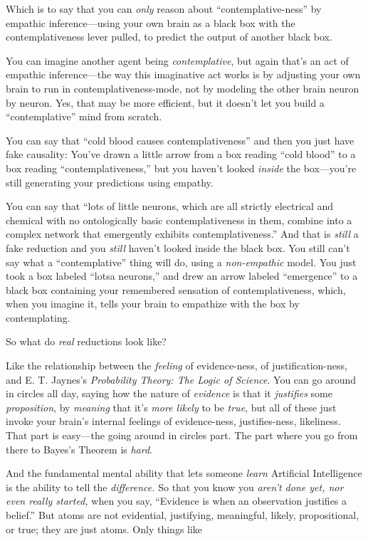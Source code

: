  Which is to say that you can \textit{only} reason about
``contemplative-ness'' by empathic
inference{}---using your own brain as a black box with the
contemplativeness lever pulled, to predict the output of another black
box.


 You can imagine another agent being \textit{contemplative}, but
again that's an act of empathic inference---the way
this imaginative act works is by adjusting your own brain to run in
contemplativeness-mode, not by modeling the other brain neuron by
neuron. Yes, that may be more efficient, but it doesn't
let you build a ``contemplative''
mind from scratch.


 You can say that ``cold blood causes
contemplativeness'' and then you just have fake
causality: You've drawn a little arrow from a box
reading ``cold blood'' to a box
reading ``contemplativeness,'' but
you haven't looked \textit{inside} the
box---you're still generating your predictions using
empathy.


 You can say that ``lots of little neurons, which
are all strictly electrical and chemical with no ontologically basic
contemplativeness in them, combine into a complex network that
emergently exhibits contemplativeness.'' And that is
\textit{still} a fake reduction and you \textit{still}
haven't looked inside the black box. You still
can't say what a
``contemplative'' thing will do,
using a \textit{non-empathic} model. You just took a box labeled
``lotsa neurons,'' and drew an arrow
labeled ``emergence'' to a black box
containing your remembered sensation of contemplativeness, which, when
you imagine it, tells your brain to empathize with the box by
contemplating.


 So what do \textit{real} reductions look like?


 Like the relationship between the \textit{feeling} of
evidence-ness, of justification-ness, and E. T.
Jaynes's \textit{Probability Theory: The Logic of
Science}. You can go around in circles all day, saying how the nature
of \textit{evidence} is that it \textit{justifies} some
\textit{proposition}, by \textit{meaning} that it's
\textit{more likely} to be \textit{true}, but all of these just invoke
your brain's internal feelings of evidence-ness,
justifies-ness, likeliness. That part is easy---the going around in
circles part. The part where you go from there to
Bayes's Theorem is \textit{hard}.


 And the fundamental mental ability that lets someone
\textit{learn} Artificial Intelligence is the ability to tell the
\textit{difference.} So that you know you
\textit{aren't done yet, nor even really started,} when
you say, ``Evidence is when an observation justifies a
belief.'' But atoms are not evidential, justifying,
meaningful, likely, propositional, or true; they are just atoms. Only
things like

